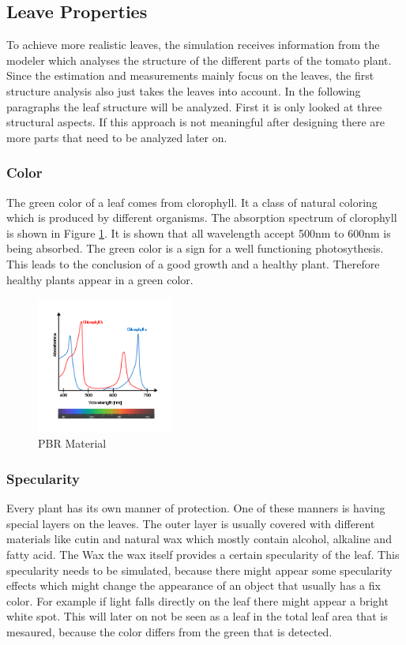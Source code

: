 
\graphicspath{{members/kh/Pictures/}}

\subsection{Leave Properties}

To achieve more realistic leaves, the simulation receives information from the modeler which analyses the structure of the different parts of the tomato plant. Since the estimation and measurements mainly focus on the leaves, the first structure analysis also just takes the leaves into account.
In the following paragraphs the leaf structure will be analyzed. First it is only looked at three structural aspects. If this approach is not meaningful after designing there are more parts that need to be analyzed later on.

\subsubsection*{Color}
The green color of a leaf comes from clorophyll. It a class of natural coloring which is produced by different organisms. 
The absorption spectrum of clorophyll is shown in Figure \ref{clorophyll}. It is shown that all wavelength accept 500nm to 600nm is being absorbed. The green color is a sign for a well functioning  photosythesis. This leads to the conclusion of a good growth and a healthy plant. Therefore healthy plants appear in a green color.

\begin{figure}[h]
	\centering
	\includegraphics[width=0.4\textwidth]{wavelength.png}
	\caption{PBR Material}
	\label{clorophyll}
\end{figure}

\subsubsection*{Specularity}
Every plant has its own manner of protection. One of these manners is having special layers on the leaves. The outer layer is usually covered with different materials like cutin and natural wax which mostly contain  alcohol, alkaline and fatty acid. The Wax the wax itself provides a certain specularity of the leaf. This specularity needs to be simulated, because there might appear some specularity effects which might change the appearance of an object that usually has a fix color. For example if light falls directly on the leaf there might appear a bright white spot. This will later on not be seen as a leaf in the total leaf area that is mesaured, because the color differs from the green that is detected.

